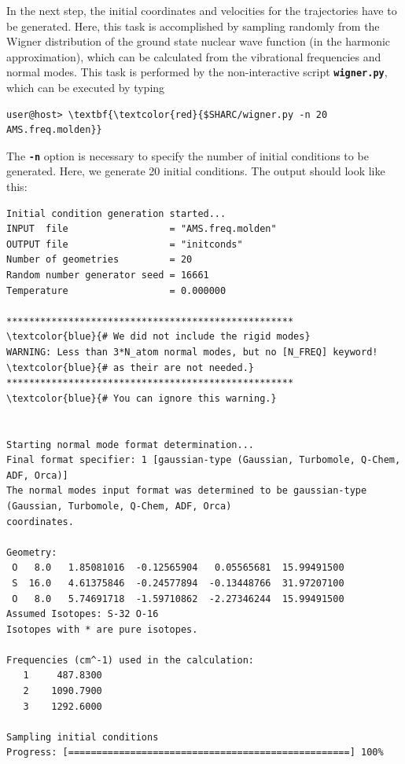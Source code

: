 \documentclass[a4paper,11pt,DIV=15,openany]{scrbook}
\newcommand{\ttt}[1]{\textbf{\texttt{#1}}}
\begin{document}
In the next step, the initial coordinates and velocities for the trajectories have to be generated.
Here, this task is accomplished by sampling randomly from the Wigner distribution of the ground state nuclear wave function (in the harmonic approximation), which can be calculated from the vibrational frequencies and normal modes.
This task is performed by the non-interactive script \ttt{wigner.py}, which can be executed by typing
\begin{Verbatim}[commandchars=\\\{\}]
user@host> \textbf{\textcolor{red}{$SHARC/wigner.py -n 20 AMS.freq.molden}}
\end{Verbatim}
The \ttt{-n} option is necessary to specify the number of initial conditions to be generated. 
Here, we generate 20 initial conditions. 
The output should look like this:
\begin{oframed}
\footnotesize\begin{Verbatim}[commandchars=\\\{\}]
Initial condition generation started...
INPUT  file                  = "AMS.freq.molden"
OUTPUT file                  = "initconds"
Number of geometries         = 20
Random number generator seed = 16661
Temperature                  = 0.000000

***************************************************                 \textcolor{blue}{# We did not include the rigid modes}
WARNING: Less than 3*N_atom normal modes, but no [N_FREQ] keyword!  \textcolor{blue}{# as their are not needed.} 
***************************************************                 \textcolor{blue}{# You can ignore this warning.}


Starting normal mode format determination...
Final format specifier: 1 [gaussian-type (Gaussian, Turbomole, Q-Chem, ADF, Orca)]
The normal modes input format was determined to be gaussian-type (Gaussian, Turbomole, Q-Chem, ADF, Orca) 
coordinates.

Geometry:
 O   8.0   1.85081016  -0.12565904   0.05565681  15.99491500 
 S  16.0   4.61375846  -0.24577894  -0.13448766  31.97207100 
 O   8.0   5.74691718  -1.59710862  -2.27346244  15.99491500 
Assumed Isotopes: S-32 O-16 
Isotopes with * are pure isotopes.

Frequencies (cm^-1) used in the calculation:
   1     487.8300
   2    1090.7900
   3    1292.6000

Sampling initial conditions
Progress: [==================================================] 100%
\end{Verbatim}
\end{oframed}
\normalsize
\end{document}
